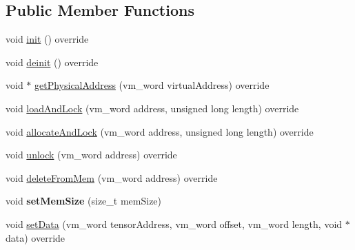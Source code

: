 \subsection*{Public Member Functions}
\begin{DoxyCompactItemize}
\item 
void \mbox{\hyperlink{classathena_1_1backend_1_1generic_1_1_generic_memory_manager_a0e39c872b8b41d5239884322988d314d}{init}} () override
\item 
void \mbox{\hyperlink{classathena_1_1backend_1_1generic_1_1_generic_memory_manager_ab90a8874618b851d5309cef66e79d08a}{deinit}} () override
\item 
void $\ast$ \mbox{\hyperlink{classathena_1_1backend_1_1generic_1_1_generic_memory_manager_a7f3dacb56bd95b837910441d0aef1dd8}{get\+Physical\+Address}} (vm\+\_\+word virtual\+Address) override
\item 
void \mbox{\hyperlink{classathena_1_1backend_1_1generic_1_1_generic_memory_manager_aa7fce5a6cbd9c4f5ad1868735e4546a8}{load\+And\+Lock}} (vm\+\_\+word address, unsigned long length) override
\item 
void \mbox{\hyperlink{classathena_1_1backend_1_1generic_1_1_generic_memory_manager_abe837ac5e3bb60c9bc24836788cae679}{allocate\+And\+Lock}} (vm\+\_\+word address, unsigned long length) override
\item 
void \mbox{\hyperlink{classathena_1_1backend_1_1generic_1_1_generic_memory_manager_a58a2b56a07a96c3cabb7b8fd079b3eae}{unlock}} (vm\+\_\+word address) override
\item 
void \mbox{\hyperlink{classathena_1_1backend_1_1generic_1_1_generic_memory_manager_a2767b6c1f5887a2928b665e0c1b454c7}{delete\+From\+Mem}} (vm\+\_\+word address) override
\item 
\mbox{\label{classathena_1_1backend_1_1generic_1_1_generic_memory_manager_ad1d29d948806569cce97e9f23ef99ad7}} 
void {\bfseries set\+Mem\+Size} (size\+\_\+t mem\+Size)
\item 
void \mbox{\hyperlink{classathena_1_1backend_1_1generic_1_1_generic_memory_manager_aa4e2e533d897cf6d042d8a086633bd9d}{set\+Data}} (vm\+\_\+word tensor\+Address, vm\+\_\+word offset, vm\+\_\+word length, void $\ast$data) override
\item 
\mbox{\label{classathena_1_1backend_1_1generic_1_1_generic_memory_manager_ad248007976c57e7635ea51d25c7e9f13}} 

\end{DoxyCompactItemize}

